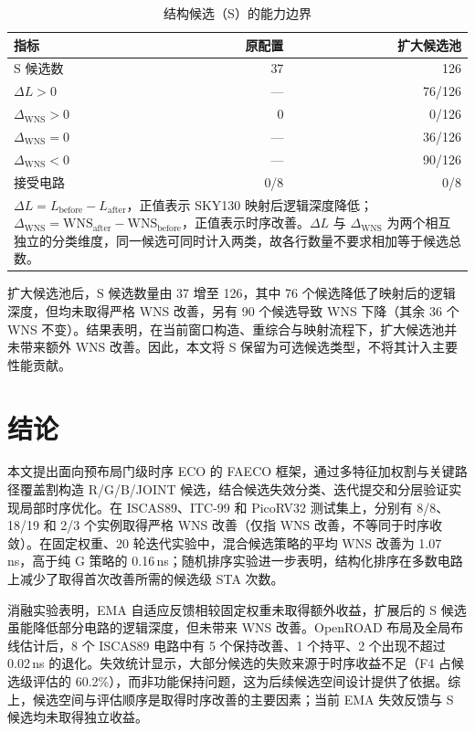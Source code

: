 \documentclass[twocolumn,10pt,fontset=windows]{ctexart}
\begin{document}
\begin{table}[H]
\centering
\caption{结构候选（S）的能力边界}
\label{tab:s_boundary}
\footnotesize
\setlength{\tabcolsep}{8pt}
\begin{tabular}{lrr}
\toprule
\textbf{指标} & \textbf{原配置} & \textbf{扩大候选池} \\
\midrule
S 候选数 & 37 & 126 \\
$\Delta L>0$ & — & 76/126 \\
$\Delta_{\mathrm{WNS}}>0$ & 0 & 0/126 \\
$\Delta_{\mathrm{WNS}}=0$ & — & 36/126 \\
$\Delta_{\mathrm{WNS}}<0$ & — & 90/126 \\
接受电路 & 0/8 & 0/8 \\
\bottomrule
\multicolumn{3}{p{0.9\columnwidth}}{\footnotesize $\Delta L=L_{\mathrm{before}}-L_{\mathrm{after}}$，正值表示 SKY130 映射后逻辑深度降低；$\Delta_{\mathrm{WNS}}=\mathrm{WNS}_{\mathrm{after}}-\mathrm{WNS}_{\mathrm{before}}$，正值表示时序改善。$\Delta L$ 与 $\Delta_{\mathrm{WNS}}$ 为两个相互独立的分类维度，同一候选可同时计入两类，故各行数量不要求相加等于候选总数。}\\
\end{tabular}
\end{table}

扩大候选池后，S 候选数量由 37 增至 126，其中 76 个候选降低了映射后的逻辑深度，但均未取得严格 WNS 改善，另有 90 个候选导致 WNS 下降（其余 36 个 WNS 不变）。结果表明，在当前窗口构造、重综合与映射流程下，扩大候选池并未带来额外 WNS 改善。因此，本文将 S 保留为可选候选类型，不将其计入主要性能贡献。

\section{结论}\label{sec:conclusion}

本文提出面向预布局门级时序 ECO 的 FAECO 框架，通过多特征加权割与关键路径覆盖割构造 R/G/B/JOINT 候选，结合候选失效分类、迭代提交和分层验证实现局部时序优化。在 ISCAS89、ITC-99 和 PicoRV32 测试集上，分别有 8/8、18/19 和 2/3 个实例取得严格 WNS 改善（仅指 WNS 改善，不等同于时序收敛）。在固定权重、20 轮迭代实验中，混合候选策略的平均 WNS 改善为 1.07\,ns，高于纯 G 策略的 0.16\,ns；随机排序实验进一步表明，结构化排序在多数电路上减少了取得首次改善所需的候选级 STA 次数。

消融实验表明，EMA 自适应反馈相较固定权重未取得额外收益，扩展后的 S 候选虽能降低部分电路的逻辑深度，但未带来 WNS 改善。OpenROAD 布局及全局布线估计后，8 个 ISCAS89 电路中有 5 个保持改善、1 个持平、2 个出现不超过 0.02\,ns 的退化。失效统计显示，大部分候选的失败来源于时序收益不足（F4 占候选级评估的 60.2\%），而非功能保持问题，这为后续候选空间设计提供了依据。综上，候选空间与评估顺序是取得时序改善的主要因素；当前 EMA 失效反馈与 S 候选均未取得独立收益。
\end{document}
